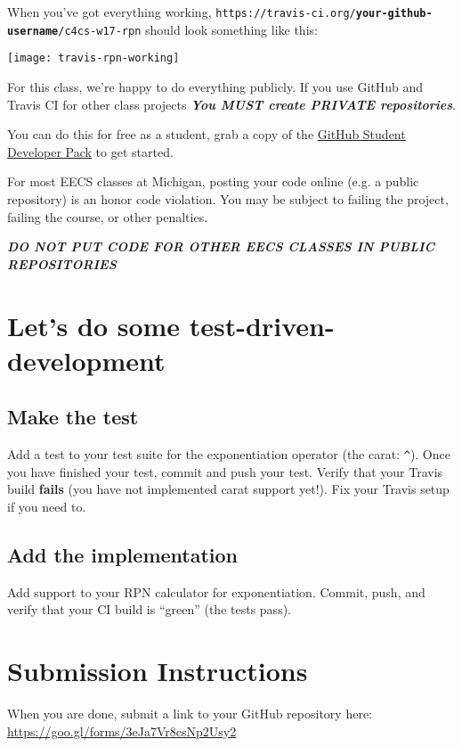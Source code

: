 \documentclass{article}
\begin{document}
When you've got everything working,
\texttt{https://travis-ci.org/\textbf{your-github-username}/c4cs-w17-rpn}
should look something like this:

\texttt{[image: travis-rpn-working]}


\vfill

\begin{mdframed}\centering
For this class, we're happy to do everything publicly. If you use GitHub and
Travis CI for other class projects
\textbf{\emph{\large You MUST create PRIVATE repositories}}.

You can do this for free as a student, grab a copy of the
\href{https://education.github.com/pack}{GitHub Student Developer Pack} to get
started.

{\color{red}
  For most EECS classes at Michigan, posting your code online (e.g. a public
  repository) is an honor code violation. You may be subject to failing the
  project, failing the course, or other penalties.

  \textbf{\emph{\Large DO NOT PUT CODE FOR OTHER EECS CLASSES IN PUBLIC REPOSITORIES}}
}
\end{mdframed}










\newpage

\section{Let's do some test-driven-development}

\subsection{Make the test}
Add a test to your test suite for the exponentiation operator (the carat:
\texttt{\^{}}). Once you have finished your test, commit and push your test.
Verify that your Travis build \textbf{fails} (you have not implemented carat
support yet!). Fix your Travis setup if you need to.

\subsection{Add the implementation}
Add support to your RPN calculator for exponentiation. Commit, push,
and verify that your CI build is ``green'' (the tests pass).


\section*{Submission Instructions}
When you are done, submit a link to your GitHub repository here: \url{https://goo.gl/forms/3eJa7Vr8csNp2Usy2}
\end{document}
